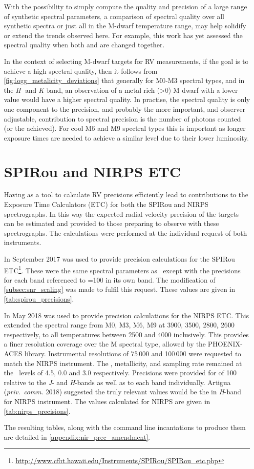 With the possibility to simply compute the quality and precision of a large range of synthetic spectral parameters, a comparison of spectral quality over all synthetic spectra or just all in the M-dwarf temperature range, may help solidify or extend the trends observed here. For example, this work has yet assessed the spectral quality when both \feh{} and \Logg{} are changed together.

In the context of selecting M-dwarf targets for {RV} measurements, if the goal is to achieve a high spectral quality, then it follows from \cref{fig:logg_metalicity_deviations} that generally for {M0}-M3 spectral types, and in the \emph{H}- and \emph{K}-band, an observation of a metal-rich (\feh{}>0) M-dwarf with a lower \Logg{} value would have a higher spectral quality.
In practise, the spectral quality is only one component to the precision, and probably the  more important, and observer adjustable,  contribution to spectral precision is the number of photons counted (or the \snr{} achieved).
For cool {M6} and {M9} spectral types this is important as longer exposure times are needed to achieve a similar \snr{} level due to their lower luminosity.


\section{{SPIRou} and {NIRPS} {ETC}}
\label{sec:spirou_nirps_etc}
Having \eniric{} as a tool to calculate {RV} precisions efficiently lead to contributions to the Exposure Time Calculators (ETC) for both the {SPIRou} and {NIRPS} spectrographs.
In this way the expected radial velocity precision of the targets can be estimated and provided to those preparing to observe with these spectrographs.
The calculations were performed at the individual request of both instruments.

In September 2017 \eniric{} was used to provide precision calculations for the {SPIRou} ETC\footnote{\url{http://www.cfht.hawaii.edu/Instruments/SPIRou/SPIRou_etc.php}}.
These were the same spectral parameters as~\citet{figueira_radial_2016} except with the precisions for each band referenced to {\snr{}=100} in its own band.
The modification of \cref{subsec:snr_scaling} was made to fulfil this request.
These values are given in \cref{tab:spirou_precisions}.

In May 2018 \eniric{} was used to provide precision calculations for the {NIRPS} {ETC}.
This extended the spectral range from {M0}, {M3}, {M6}, {M9} at 3900, 3500, 2800, 2600\K{} respectively, to all temperatures between 2500\K{} and 4000\K{} inclusively.
This provides a finer resolution coverage over the M spectral type, allowed by the {PHOENIX-ACES} library.
Instrumental resolutions of 75\,000 and 100\,000 were requested to match the {NIRPS} instrument.
The \Logg{}, metallicity, and sampling rate remained at the~\citet{figueira_radial_2016} levels of 4.5, 0.0 and 3.0 respectively.
Precisions were provided for \snr{} of 100 relative to the \emph{J}- and \emph{H}-bands as well as to each band individually.
Artigua (\emph{priv.\ comm.} 2018) suggested the truly relevant values would be the \snr{} in \emph{H}-band for {NIRPS} instrument.
The values calculated for {NIRPS} are given in \cref{tab:nirps_precisions}.

The resulting tables, along with the command line incantations to produce them are detailed in \cref{appendix:nir_prec_amendment}.

\clearpage
